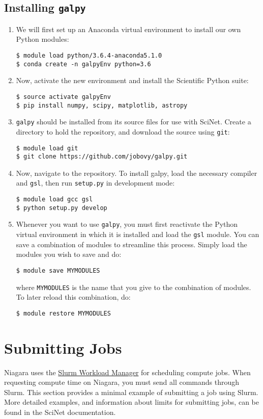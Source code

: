\documentclass[12pt]{article}
\begin{document}
\subsection {Installing \texttt{galpy}}
\begin{enumerate}[leftmargin=*]
\item We will first set up an Anaconda virtual environment to install our own Python modules:
\begin{lstlisting}
$ module load python/3.6.4-anaconda5.1.0
$ conda create -n galpyEnv python=3.6
\end{lstlisting}
\item Now, activate the new environment and install the Scientific Python suite:
\begin{lstlisting}
$ source activate galpyEnv
$ pip install numpy, scipy, matplotlib, astropy
\end{lstlisting}
\item \texttt{galpy} should be installed from its source files for use with SciNet. Create a directory to hold the repository, and download the source using \texttt{git}:
\begin{lstlisting}
$ module load git
$ git clone https://github.com/jobovy/galpy.git
\end{lstlisting}
\item Now, navigate to the repository. To install galpy, load the necessary compiler and \texttt{gsl}, then run \texttt{setup.py} in development mode:
\begin{lstlisting}
$ module load gcc gsl
$ python setup.py develop
\end{lstlisting}
\item Whenever you want to use \texttt{galpy}, you must first reactivate the Python virtual environment in which it is installed and load the \texttt{gsl} module. You can save a combination of modules to streamline this process. Simply load the modules you wish to save and do:
\begin{lstlisting}
$ module save MYMODULES
\end{lstlisting}
where \texttt{MYMODULES} is the name that you give to the combination of modules. To later reload this combination, do:
\begin{lstlisting}
$ module restore MYMODULES
\end{lstlisting}
\end{enumerate}

\section{Submitting Jobs}
Niagara uses the \href{https://docs.scinet.utoronto.ca/index.php/Slurm}{Slurm Workload Manager} for scheduling compute jobs. When requesting compute time on Niagara, you must send all commands through Slurm. This section provides a minimal example of submitting a job using Slurm. More detailed examples, and information about limits for submitting jobs, can be found in the SciNet documentation.
\end{document}
